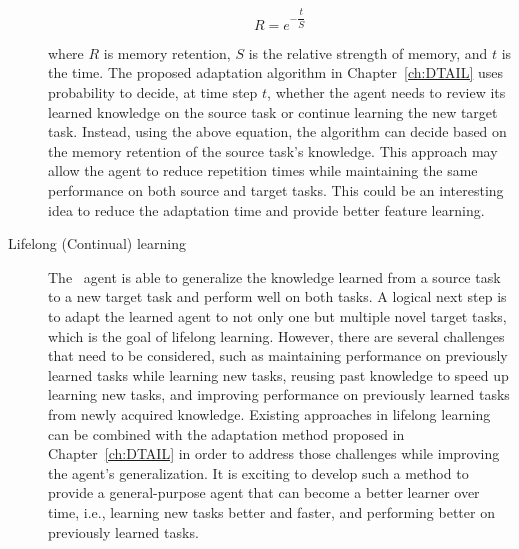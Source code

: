 \begin{description}
        \[R = e^{-\dfrac{t}{S}}\]

        where $R$ is memory retention,
        $S$ is the relative strength of memory,
        and $t$ is the time.
        The proposed adaptation algorithm in Chapter~\ref{ch:DTAIL} uses probability to decide,
        at time step $t$,
        whether the agent needs to review its learned knowledge on the source task or continue learning the new target task.
        Instead,
        using the above equation,
        the algorithm can decide based on the memory retention of the source task's knowledge.
        This approach may allow the agent to reduce repetition times while maintaining the same performance on both source and target tasks.
        This could be an interesting idea to reduce the adaptation time and provide better feature learning.

  \item[Lifelong (Continual) learning]
        The \DTAIL\ agent is able to generalize the knowledge learned from a source task to a new target task and perform well on both tasks.
        A logical next step is to adapt the learned agent to not only one but multiple novel target tasks,
        which is the goal of lifelong learning.
        However,
        there are several challenges that need to be considered,
        such as maintaining performance on previously learned tasks while learning new tasks,
        reusing past knowledge to speed up learning new tasks,
        and improving performance on previously learned tasks from newly acquired knowledge.
        Existing approaches in lifelong learning can be combined with the adaptation method proposed in Chapter~\ref{ch:DTAIL} in order to address those challenges while improving the agent's generalization.
        It is exciting to develop such a method to provide a general-purpose agent that can become a better learner over time,
        i.e.,
        learning new tasks better and faster,
        and performing better on previously learned tasks.

\end{description}
